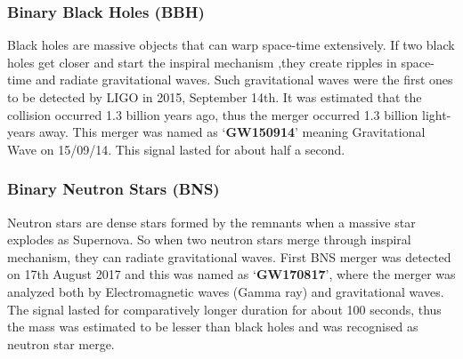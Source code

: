 \pagebreak

\subsubsection{Binary Black Holes (BBH)}

Black holes are massive objects that can warp space-time extensively. If two black holes get closer and start the inspiral mechanism ,they create ripples in space-time and radiate gravitational waves. Such gravitational waves were the first ones to be detected by LIGO in 2015, September 14th. It was estimated that the collision occurred 1.3 billion years ago, thus the merger occurred 1.3 billion light-years away. This merger was named as `\textbf{GW150914}' meaning Gravitational Wave on 15/09/14. This signal lasted for about half a second.

\subsubsection{Binary Neutron Stars (BNS)}

Neutron stars are dense stars formed by the remnants when a massive star explodes as Supernova. So when two neutron stars merge through inspiral mechanism, they can radiate gravitational waves. First BNS merger was detected on 17th August 2017 and this was named as `\textbf{GW170817}', where the merger was analyzed both by Electromagnetic waves (Gamma ray) and gravitational waves. The signal lasted for comparatively longer duration for about 100 seconds, thus the mass was estimated to be lesser than black holes and was recognised as neutron star merge.



